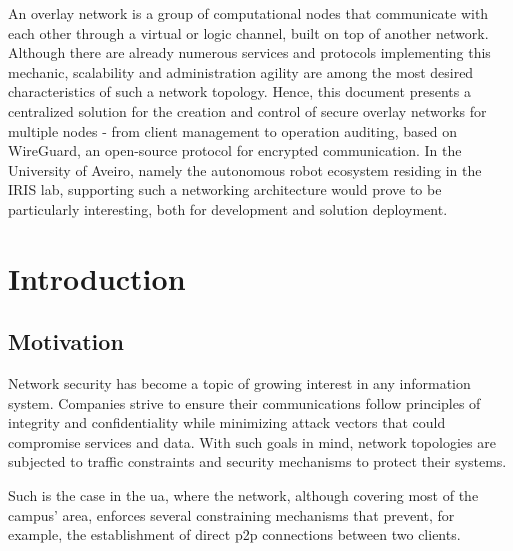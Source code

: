 \documentclass[11pt,twoside,a4paper]{report}
\begin{document}
\TitlePage
  \vspace*{55mm}
       {An overlay network is a group of computational nodes that communicate with each other through a virtual or logic channel, built on top of another network. Although there are already numerous services and protocols implementing this mechanic, scalability and administration agility are among the most desired characteristics of such a network topology. Hence, this document presents a centralized solution for the creation and control of secure overlay networks for multiple nodes - from client management to operation auditing, based on WireGuard, an open-source protocol for encrypted communication. In the University of Aveiro, namely the autonomous robot ecosystem residing in the IRIS lab, supporting such a networking architecture would prove to be particularly interesting, both for development and solution deployment.}
\EndTitlePage
\titlepage\ \endtitlepage %


%
%
\tableofcontents

\cleardoublepage
\listoffigures

\cleardoublepage
\listoftables

\cleardoublepage


\cleardoublepage
{}
\chapter{Introduction}

\section{Motivation}

Network security has become a topic of growing interest in any information system. Companies strive to ensure their communications follow principles of integrity and confidentiality while minimizing attack vectors that could compromise services and data. With such goals in mind, network topologies are subjected to traffic constraints and security mechanisms to protect their systems.

Such is the case in the \ac{ua}, where the network, although covering most of the campus' area, enforces several constraining mechanisms that prevent, for example, the establishment of direct \ac{p2p} connections between two clients.
\end{document}
